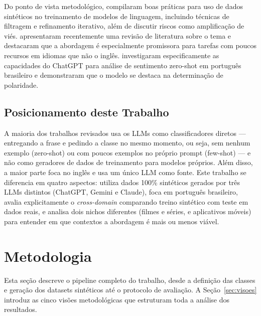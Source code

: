 \documentclass[12pt]{article}
\begin{document}
Do ponto de vista metodológico, \cite{liu2024best} compilaram boas práticas para uso de dados sintéticos no treinamento de modelos de linguagem, incluindo técnicas de filtragem e refinamento iterativo, além de discutir riscos como amplificação de viés. \cite{nadas2025synthetic} apresentaram recentemente uma revisão de literatura sobre o tema e destacaram que a abordagem é especialmente promissora para tarefas com poucos recursos em idiomas que não o inglês. \cite{araujo2024chatgpt} investigaram especificamente as capacidades do ChatGPT para análise de sentimento zero-shot em português brasileiro e demonstraram que o modelo se destaca na determinação de polaridade.

\subsection{Posicionamento deste Trabalho}

A maioria dos trabalhos revisados usa os LLMs como classificadores diretos — entregando a frase e pedindo a classe no mesmo momento, ou seja, sem nenhum exemplo (zero-shot) ou com poucos exemplos no próprio prompt (few-shot) — e não como geradores de dados de treinamento para modelos próprios. Além disso, a maior parte foca no inglês e usa um único LLM como fonte. Este trabalho se diferencia em quatro aspectos: utiliza dados 100\% sintéticos gerados por três LLMs distintos (ChatGPT, Gemini e Claude), foca em português brasileiro, avalia explicitamente o \textit{cross-domain} comparando treino sintético com teste em dados reais, e analisa dois nichos diferentes (filmes e séries, e aplicativos móveis) para entender em que contextos a abordagem é mais ou menos viável.



\section{Metodologia}
\label{sec:metodologia}

Esta seção descreve o pipeline completo do trabalho, desde a definição das classes e geração dos datasets sintéticos até o protocolo de avaliação. A Seção~\ref{sec:visoes} introduz as cinco visões metodológicas que estruturam toda a análise dos resultados.
\end{document}
